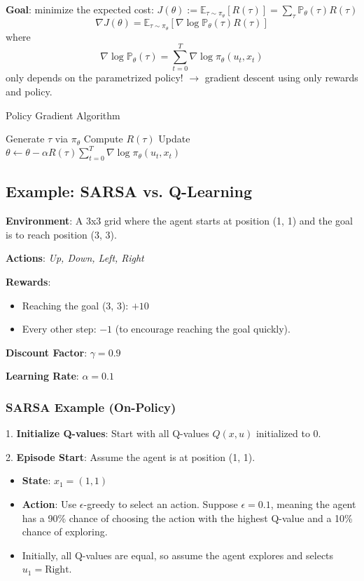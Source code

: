 \textbf{Goal}: minimize the expected cost: \qquad $J(\theta) := \mathbb{E}_{\tau \sim \pi_{\theta}} [R(\tau)] = \sum_{\tau} \mathbb{P}_{\theta}(\tau) R(\tau)$
\[
\nabla J(\theta) = \mathbb{E}_{\tau \sim \pi_{\theta}} \left[ \nabla \log \mathbb{P}_{\theta}(\tau) R(\tau) \right]
\]
where
\[
\nabla \log \mathbb{P}_{\theta}(\tau) = \sum_{t=0}^{T} \nabla \log \pi_{\theta}(u_t, x_t)
\]
only depends on the parametrized policy! $\rightarrow$ gradient descent using only rewards and policy.
\begin{algorithm}[H]
\caption{Policy Gradient Algorithm}
\begin{algorithmic}[1]
    \State Generate $\tau$ via $\pi_{\theta}$
    \State Compute $R(\tau)$
    \State Update $\theta \gets \theta - \alpha R(\tau) \sum_{t=0}^{T} \nabla \log \pi_{\theta}(u_t, x_t)$
\end{algorithmic}
\end{algorithm}

\newpage

\subsection*{Example: SARSA vs. Q-Learning}

\textbf{Environment}: A 3x3 grid where the agent starts at position (1, 1) and the goal is to reach position (3, 3).

\textbf{Actions}: \textit{Up, Down, Left, Right}

\textbf{Rewards}:
\begin{itemize}
    \item Reaching the goal (3, 3): \(+10\)
    \item Every other step: \(-1\) (to encourage reaching the goal quickly).
\end{itemize}

\textbf{Discount Factor}: \( \gamma = 0.9 \)

\textbf{Learning Rate}: \( \alpha = 0.1 \)

\subsubsection*{SARSA Example (On-Policy)}

1. \textbf{Initialize Q-values}: Start with all Q-values \( Q(x, u) \) initialized to 0.

2. \textbf{Episode Start}: Assume the agent is at position (1, 1).
   \begin{itemize}
       \item \textbf{State}: \( x_1 = (1, 1) \)
       \item \textbf{Action}: Use \(\epsilon\)-greedy to select an action. Suppose \(\epsilon = 0.1\), meaning the agent has a 90\% chance of choosing the action with the highest Q-value and a 10\% chance of exploring. 
       \item Initially, all Q-values are equal, so assume the agent explores and selects \( u_1 = \text{Right} \).
   \end{itemize}

